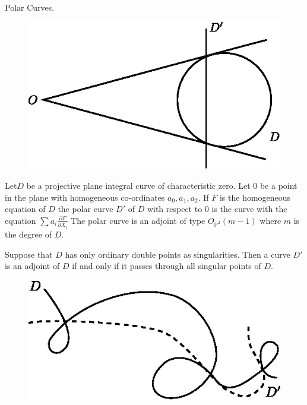 \begin{exam}\label{chap2:exm1}
Polar Curves.
\begin{figure}[H]
\centering
\includegraphics{figure/fig5.eps}
\end{figure}

Let\pageoriginale $D$ be a projective plane integral curve of
characteristic zero. Let $0$ be a point in the plane with homogeneous
co-ordinates $a_0,a_1,a_2$. If $F$ is the homogeneous equation of $D$
the polar curve $D'$ of $D$ with respect to $0$ is the curve with the
equation $\sum a_i\frac{\partial F}{\partial X_i}$ The polar curve
is an adjoint of type $O_{\mathbb{P}^2}(m-1)$ where $m$ is the degree
of $D$.
\end{exam}

\begin{exam}\label{chap2:exm2}
Suppose that $D$ has only ordinary double points as
singularities. Then a curve $D'$ is an adjoint of $D$ if and only if it
passes through all singular points of $D$.
\begin{figure}[H]
\centering
\includegraphics{figure/fig6.eps}
\end{figure}
\end{exam}

